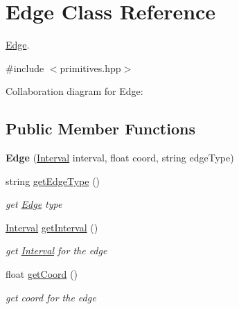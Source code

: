 \hypertarget{classEdge}{}\section{Edge Class Reference}
\label{classEdge}


\hyperlink{classEdge}{Edge}.  




{\ttfamily \#include $<$primitives.\+hpp$>$}



Collaboration diagram for Edge\+:
\subsection*{Public Member Functions}
\begin{DoxyCompactItemize}
\item 
\mbox{\label{classEdge_aad89ff4f7c85decf8b00c9f96b72ada3}} 
{\bfseries Edge} (\hyperlink{classInterval}{Interval} interval, float coord, string edge\+Type)
\item 
\mbox{\label{classEdge_ab996b76d5343965ad1087896e4c30446}} 
string \hyperlink{classEdge_ab996b76d5343965ad1087896e4c30446}{get\+Edge\+Type} ()
\begin{DoxyCompactList}\small\item\em get \hyperlink{classEdge}{Edge} type \end{DoxyCompactList}\item 
\mbox{\label{classEdge_aafea0a338f79c8397f175d7a58017361}} 
\hyperlink{classInterval}{Interval} \hyperlink{classEdge_aafea0a338f79c8397f175d7a58017361}{get\+Interval} ()
\begin{DoxyCompactList}\small\item\em get \hyperlink{classInterval}{Interval} for the edge \end{DoxyCompactList}\item 
\mbox{\label{classEdge_a2bdfd6b59be8ab33b9ab1cd0d02f4ab7}} 
float \hyperlink{classEdge_a2bdfd6b59be8ab33b9ab1cd0d02f4ab7}{get\+Coord} ()
\begin{DoxyCompactList}\small\item\em get coord for the edge \end{DoxyCompactList}\end{DoxyCompactItemize}
